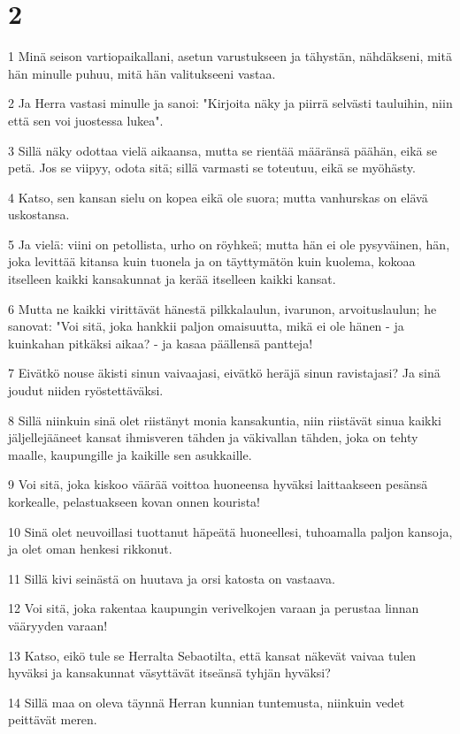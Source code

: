 \chapter{2}

\par 1 Minä seison vartiopaikallani, asetun varustukseen ja tähystän, nähdäkseni, mitä hän minulle puhuu, mitä hän valitukseeni vastaa.
\par 2 Ja Herra vastasi minulle ja sanoi: "Kirjoita näky ja piirrä selvästi tauluihin, niin että sen voi juostessa lukea".
\par 3 Sillä näky odottaa vielä aikaansa, mutta se rientää määränsä päähän, eikä se petä. Jos se viipyy, odota sitä; sillä varmasti se toteutuu, eikä se myöhästy.
\par 4 Katso, sen kansan sielu on kopea eikä ole suora; mutta vanhurskas on elävä uskostansa.
\par 5 Ja vielä: viini on petollista, urho on röyhkeä; mutta hän ei ole pysyväinen, hän, joka levittää kitansa kuin tuonela ja on täyttymätön kuin kuolema, kokoaa itselleen kaikki kansakunnat ja kerää itselleen kaikki kansat.
\par 6 Mutta ne kaikki virittävät hänestä pilkkalaulun, ivarunon, arvoituslaulun; he sanovat: "Voi sitä, joka hankkii paljon omaisuutta, mikä ei ole hänen - ja kuinkahan pitkäksi aikaa? - ja kasaa päällensä pantteja!
\par 7 Eivätkö nouse äkisti sinun vaivaajasi, eivätkö heräjä sinun ravistajasi? Ja sinä joudut niiden ryöstettäväksi.
\par 8 Sillä niinkuin sinä olet riistänyt monia kansakuntia, niin riistävät sinua kaikki jäljellejääneet kansat ihmisveren tähden ja väkivallan tähden, joka on tehty maalle, kaupungille ja kaikille sen asukkaille.
\par 9 Voi sitä, joka kiskoo väärää voittoa huoneensa hyväksi laittaakseen pesänsä korkealle, pelastuakseen kovan onnen kourista!
\par 10 Sinä olet neuvoillasi tuottanut häpeätä huoneellesi, tuhoamalla paljon kansoja, ja olet oman henkesi rikkonut.
\par 11 Sillä kivi seinästä on huutava ja orsi katosta on vastaava.
\par 12 Voi sitä, joka rakentaa kaupungin verivelkojen varaan ja perustaa linnan vääryyden varaan!
\par 13 Katso, eikö tule se Herralta Sebaotilta, että kansat näkevät vaivaa tulen hyväksi ja kansakunnat väsyttävät itseänsä tyhjän hyväksi?
\par 14 Sillä maa on oleva täynnä Herran kunnian tuntemusta, niinkuin vedet peittävät meren.
